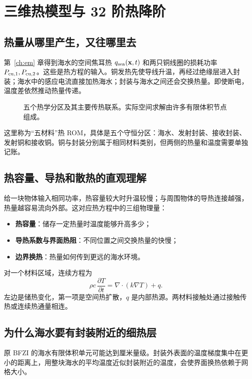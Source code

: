 \chapter{三维热模型与 32 阶热降阶}
\label{ch:heat}

\section{热量从哪里产生，又往哪里去}
第~\ref{ch:em} 章得到海水的空间焦耳热 $q_{\rm sea}(\mathbf x,t)$ 和两只铜线圈的损耗功率 $P_{{\rm cu},1},P_{{\rm cu},2}$。这些是热方程的输入。铜发热先使导线升温，再经过绝缘层进入封装；海水中的感应电流直接加热海水；封装与海水之间还会交换热量。即使断电，温度差依然推动热量传递。

\begin{figure}[htbp]
\centering\resizebox{0.95\textwidth}{!}{}
\caption{五个热学分区及其主要传热联系。实际空间求解由许多有限体积节点组成。}
\label{fig:heat}
\end{figure}

这里称为“五材料”热 ROM，具体是五个守恒分区：海水、发射封装、接收封装、发射铜和接收铜。铜与封装分别属于相同材料类别，但两侧的热量和温度需要单独记账。

\section{热容量、导热和散热的直观理解}
给一块物体输入相同功率，热容量较大时升温较慢；与周围物体的导热连接越强，热量越容易流向外部。这对应热方程中的三组物理量：
\begin{itemize}
\item \textbf{热容量}：储存一定热量时温度能够升高多少；
\item \textbf{导热系数与界面热阻}：不同位置之间交换热量的快慢；
\item \textbf{边界换热}：热量如何传到更远的海水环境。
\end{itemize}
对一个材料区域，连续方程为
\[
\rho c\,\frac{\partial T}{\partial t}
=\nabla\cdot(k\nabla T)+q.
\]
左边是储热变化，第一项是空间热扩散，$q$ 是内部热源。两材料接触处通过接触传热或连续热通量相连。

\section{为什么海水要有封装附近的细热层}
原 BFZI 的海水有限体积单元可能达到厘米量级。封装外表面的温度梯度集中在更小的距离上，用整块海水的平均温度近似封装附近的温度，会使界面换热依赖于网格大小。

